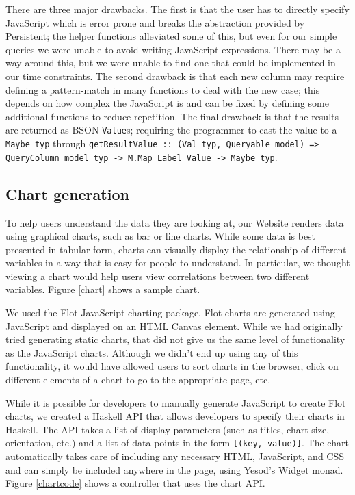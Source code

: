 \documentclass[letterpaper,twocolumn,9pt]{article}
\newcommand{\code}[1]{\texttt{#1}}
\begin{document}
There are three major drawbacks.  The first is that the user has to directly specify JavaScript which is error prone and breaks the abstraction provided by Persistent; the helper functions alleviated some of this, but even for our simple queries we were unable to avoid writing JavaScript expressions.  There may be a way around this, but we were unable to find one that could be implemented in our time constraints.  The second drawback is that each new column may require defining a pattern-match in many functions to deal with the new case; this depends on how complex the JavaScript is and can be fixed by defining some additional functions to reduce repetition.  The final drawback is that the results are returned as BSON \code{Value}s; requiring the programmer to cast the value to a \code{Maybe typ} through \code{getResultValue :: (Val typ, Queryable model) => QueryColumn model typ -> M.Map Label Value -> Maybe typ}.

\subsection{Chart generation}

To help users understand the data they are looking at, our Website renders data using graphical charts, such as bar or line charts. While some data is best presented in tabular form, charts can visually display the relationship of different variables in a way that is easy for people to understand. In particular, we thought viewing a chart would help users view correlations between two different variables. Figure \ref{chart} shows a sample chart.

We used the Flot\cite{flot} JavaScript charting package. Flot charts are generated using JavaScript and displayed on an HTML Canvas element. While we had originally tried generating static charts, that did not give us the same level of functionality as the JavaScript charts. Although we didn't end up using any of this functionality, it would have allowed users to sort charts in the browser, click on different elements of a chart to go to the appropriate page, etc.

While it is possible for developers to manually generate JavaScript to create Flot charts, we created a Haskell API that allows developers to specify their charts in Haskell. The API takes a list of display parameters (such as titles, chart size, orientation, etc.) and a list of data points in the form \code{[(key, value)]}. The chart automatically takes care of including any necessary HTML, JavaScript, and CSS and can simply be included anywhere in the page, using Yesod's Widget monad. Figure \ref{chartcode} shows a controller that uses the chart API. 
\end{document}
